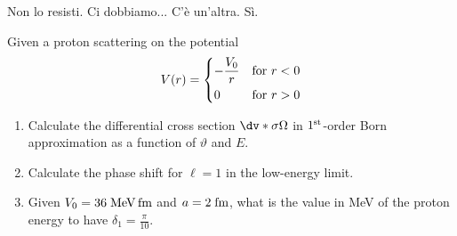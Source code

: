 \begin{soluzione}
Non lo resisti. Ci dobbiamo... C'è un'altra. Sì.
\end{soluzione}

\newpage
\setcounter{equation}{0}

\begin{esercizio}
   Given a proton scattering on the potential
   \begin{equation*}
      V(r)=
      \begin{dcases}
         -\frac{V_0}{r} & \text{for } r<0\\
         0 & \text{for } r>0
      \end{dcases}
   \end{equation*}
   \begin{enumerate}[label=\alph*), leftmargin=0.6cm]
      \item Calculate the differential cross section $\dv*{\sigma}{\Omega}$ in $1^{\rm st}$-order Born approximation as a function of $\vartheta$ and $E$.
      \item Calculate the phase shift for $\ell=1$ in the low-energy limit.
      \item Given $V_0=36 \; \rm MeV \, fm$ and $a=2 \; \rm fm$, what is the value in MeV of the proton energy to have $\delta_1=\frac{\pi}{10}$.
   \end{enumerate}
\end{esercizio}
